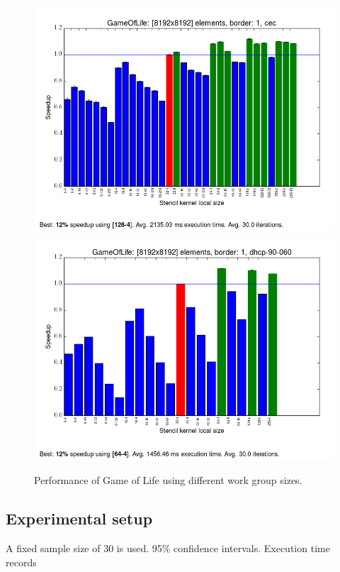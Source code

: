 \begin{figure}[h]
\includegraphics[width=\textwidth]{../../benchmarks/results/e4/GameOfLife-00008192-01-cec.png}
\includegraphics[width=\textwidth]{../../benchmarks/results/e4/GameOfLife-00008192-01-dhcp-90-060.png}
\caption{Performance of Game of Life using different work group
  sizes.}
\end{figure}

\subsection*{Experimental setup}

A fixed sample size of 30 is used. 95\% confidence
intervals. Execution time records

